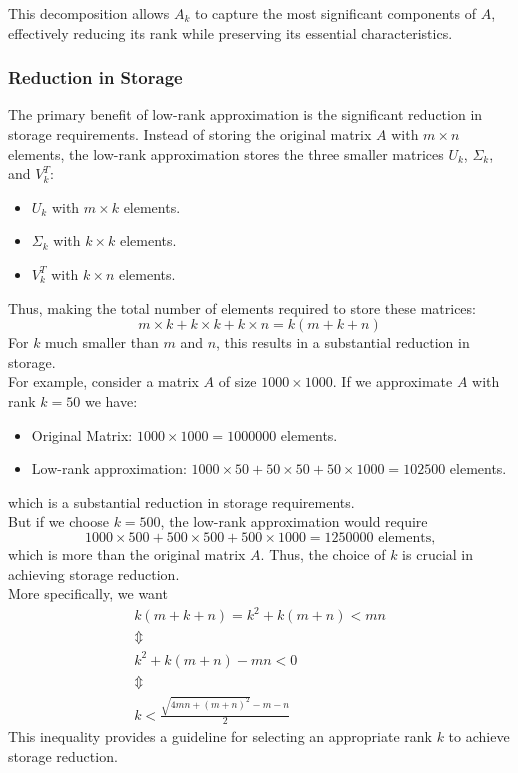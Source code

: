     This decomposition allows $A_k$ to capture the most significant components of $A$, effectively reducing its rank while preserving its essential characteristics.
    
    \subsubsection{Reduction in Storage}\label{sec:reduction_storage}
    
    The primary benefit of low-rank approximation is the significant reduction in storage requirements. Instead of storing the original matrix $A$ with $m \times n$ elements, the low-rank approximation stores the three smaller matrices $U_k$, $\Sigma_k$, and $V_k^T$:
    
    \begin{itemize}
        \item $U_k$ with $m \times k$ elements.
        \item $\Sigma_k$ with $k \times k$ elements.
        \item $V_k^T$ with $k \times n$ elements.
    \end{itemize}
    Thus, making the total number of elements required to store these matrices:
    \begin{displaymath}
        m \times k + k \times k + k \times n = k(m + k + n)
    \end{displaymath}
    For \(k\) much smaller than \(m\) and \(n\), this results in a substantial reduction in storage.\\
    For example, consider a matrix \(A\) of size \(1000 \times 1000\). If we approximate \(A\) with rank \(k = 50\) we have:
    \begin{itemize}
        \item Original Matrix: \(1000 \times 1000 = 1000000\) elements.
        \item Low-rank approximation: \(1000 \times 50 + 50 \times 50 + 50 \times 1000 = 102500\) elements.
    \end{itemize}
    which is a substantial reduction in storage requirements.\\
    But if we choose \(k = 500\), the low-rank approximation would require 
    \begin{displaymath}
        1000 \times 500 + 500 \times 500 + 500 \times 1000 = 1250000 \text{ elements,}
    \end{displaymath} which is more than the original matrix \(A\). Thus, the choice of \(k\) is crucial in achieving storage reduction.\\
    More specifically, we want
    \begin{gather*}
        k(m+k+n) = k^2 + k(m+n) < mn \\
        \Updownarrow \\
        k^2 + k(m+n) - mn < 0 \\
        \Updownarrow \\
        k < \frac{\sqrt{4mn + (m+n)^2} - m - n}{2}
    \end{gather*}
    This inequality provides a guideline for selecting an appropriate rank \(k\) to achieve storage reduction.
    
